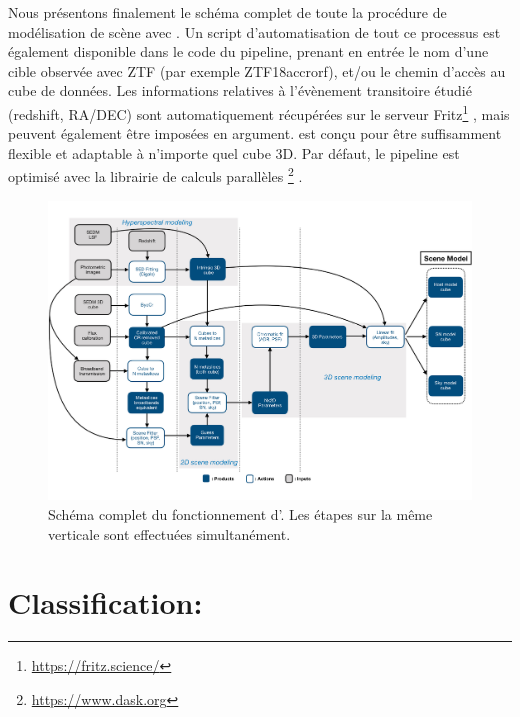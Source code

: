 \documentclass[../main/main.tex]{subfiles}
\begin{document}
Nous présentons finalement le schéma complet de toute la procédure de
modélisation de scène avec \hypergal. Un script d'automatisation de tout
ce processus est également disponible dans le code du pipeline, prenant
en entrée le nom d'une cible observée avec ZTF (par exemple
ZTF18accrorf), et/ou le chemin d'accès au cube de données. Les
informations relatives à l'évènement transitoire étudié (redshift, RA/DEC) sont
automatiquement récupérées sur le serveur
Fritz\footnote{\url{https://fritz.science/}} \citep{skyportal2019,
  duev2019real, Kasliwal_2019, Duev2021}, mais peuvent également être
imposées en argument. \hypergal est conçu pour être suffisamment
flexible et adaptable à n'importe quel cube 3D.
Par défaut, le pipeline est optimisé avec la librairie de calculs
parallèles \footnote{\url{https://www.dask.org}}
\citep{Dask}.

\begin{landscape}
\begin{figure}
  \centering
  \includegraphics[width=0.99\linewidth]{../figures/07_scene/Fulldaghypergal.pdf}
  \caption{Schéma complet du fonctionnement d'\hypergal. Les étapes sur
    la même verticale sont effectuées simultanément.}
  \label{fig:fulldag}
\end{figure}
\end{landscape}
\section{Classification: }\label{sec:snidclassification}
\end{document}
